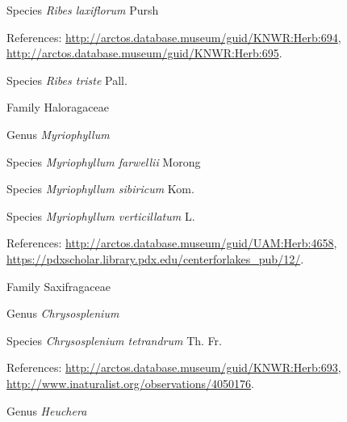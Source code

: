 \documentclass[9pt, article]{memoir}
\begin{document}
\begin{multicols}{2}
\vspace{6pt}\noindent\hspace{36pt}Species \textit{Ribes laxiflorum} Pursh


\vspace{6pt}References: 
\url{http://arctos.database.museum/guid/KNWR:Herb:694}, 
\url{http://arctos.database.museum/guid/KNWR:Herb:695}.

\vspace{6pt}\noindent\hspace{36pt}Species \textit{Ribes triste} Pall.


\vspace{6pt}\noindent\hspace{24pt}Family Haloragaceae


\vspace{6pt}\noindent\hspace{30pt}Genus \textit{Myriophyllum}


\vspace{6pt}\noindent\hspace{36pt}Species \textit{Myriophyllum farwellii} Morong


\vspace{6pt}\noindent\hspace{36pt}Species \textit{Myriophyllum sibiricum} Kom.


\vspace{6pt}\noindent\hspace{36pt}Species \textit{Myriophyllum verticillatum} L.


\vspace{6pt}References: 
\url{http://arctos.database.museum/guid/UAM:Herb:4658}, 
\url{https://pdxscholar.library.pdx.edu/centerforlakes_pub/12/}.

\vspace{6pt}\noindent\hspace{24pt}Family Saxifragaceae


\vspace{6pt}\noindent\hspace{30pt}Genus \textit{Chrysosplenium}


\vspace{6pt}\noindent\hspace{36pt}Species \textit{Chrysosplenium tetrandrum} Th. Fr.


\vspace{6pt}References: 
\url{http://arctos.database.museum/guid/KNWR:Herb:693}, 
\url{http://www.inaturalist.org/observations/4050176}.

\vspace{6pt}\noindent\hspace{30pt}Genus \textit{Heuchera}



\end{multicols}
\end{document}

